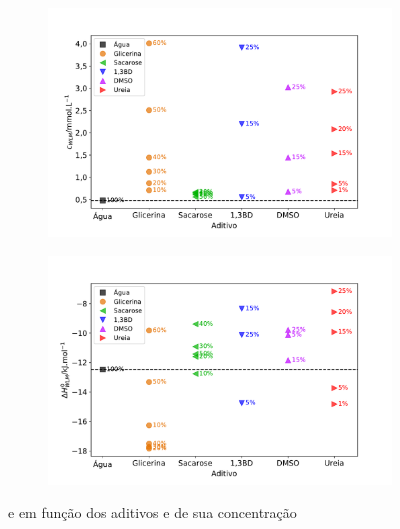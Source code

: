 			\begin{figure}[h]
				\begin{subfigure}[t]{0.5\textwidth}
					\centering
					\includegraphics[width=\textwidth]{imagens/itc/Cwlm_por_Aditivo}
					\caption{\cwlm{}}
					\label{fig:cwlm_por_aditivo}
				\end{subfigure}%
				\begin{subfigure}[t]{0.5\textwidth}
					\centering
					\includegraphics[width=\textwidth]{imagens/itc/DHwlm_por_Aditivo}
					\caption{\DHwlm{}}
					\label{fig:dhwlm_por_aditivo}
				\end{subfigure}
				\caption{\cwlm{} e \DHwlm{} em função dos aditivos e de sua concentração}
				\label{fig:cwlm_dhwlm_por_aditivo}
			\end{figure} 
		
